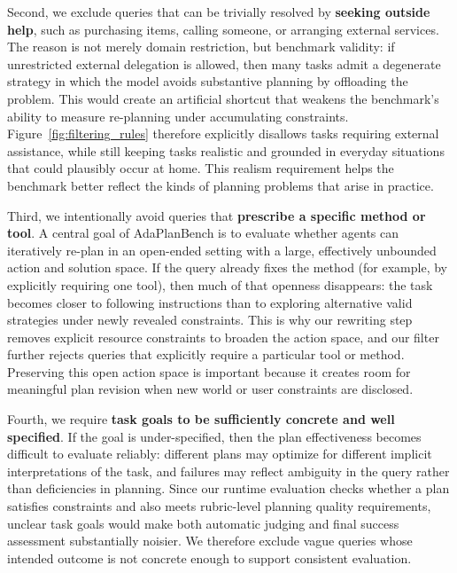 \documentclass{llmxive}
\providecommand{\bench}[1]{AdaPlanBench}
\begin{document}
Second, we exclude queries that can be trivially resolved by \textbf{seeking outside help}, such as purchasing items, calling someone, or arranging external services. 
The reason is not merely domain restriction, but benchmark validity: if unrestricted external delegation is allowed, then many tasks admit a degenerate strategy in which the model avoids substantive planning by offloading the problem. 
This would create an artificial shortcut that weakens the benchmark's ability to measure re-planning under accumulating constraints. 
Figure~\ref{fig:filtering_rules} therefore explicitly disallows tasks requiring external assistance, while still keeping tasks realistic and grounded in everyday situations that could plausibly occur at home. 
This realism requirement helps the benchmark better reflect the kinds of planning problems that arise in practice.

Third, we intentionally avoid queries that \textbf{prescribe a specific method or tool}. 
A central goal of \bench{} is to evaluate whether agents can iteratively re-plan in an open-ended setting with a large, effectively unbounded action and solution space. 
If the query already fixes the method (for example, by explicitly requiring one tool), then much of that openness disappears: the task becomes closer to following instructions than to exploring alternative valid strategies under newly revealed constraints.
This is why our rewriting step removes explicit resource constraints to broaden the action space, and our filter further rejects queries that explicitly require a particular tool or method. 
Preserving this open action space is important because it creates room for meaningful plan revision when new world or user constraints are disclosed.

Fourth, we require \textbf{task goals to be sufficiently concrete and well specified}. 
If the goal is under-specified, then the plan effectiveness becomes difficult to evaluate reliably: different plans may optimize for different implicit interpretations of the task, and failures may reflect ambiguity in the query rather than deficiencies in planning. 
Since our runtime evaluation checks whether a plan satisfies constraints and also meets rubric-level planning quality requirements, unclear task goals would make both automatic judging and final success assessment substantially noisier. 
We therefore exclude vague queries whose intended outcome is not concrete enough to support consistent evaluation.
\end{document}
